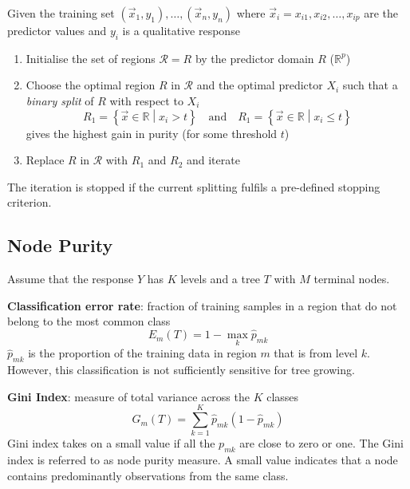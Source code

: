 \documentclass[11pt]{article}
\newcommand*\R{\mathbb{R}}
\begin{document}
\begin{definition}
	Given the training set $(\vec{x}_1,y_1),\dots,(\vec{x}_n,y_n)$ where $\vec{x}_i = x_{i1}, x_{i2}, \dots, x_{ip}$ are the predictor values and $y_i$ is a qualitative response
	\begin{enumerate}
		\item Initialise the set of regions $\mathcal{R} = {R}$ by the predictor domain $R$ ($\R^p$)
		\item Choose the optimal region $R$ in $\mathcal{R}$ and the optimal predictor $X_i$ such that a \emph{binary split} of $R$ with respect to $X_i$
		\begin{equation*}
			R_1 = \left\{ \vec{x} \in \R \middle| x_i > t \right\} \quad\text{and}\quad R_1 = \left\{ \vec{x} \in \R \middle| x_i \leq t \right\}
		\end{equation*}
		gives the highest gain in purity (for some threshold $t$)
		\item Replace $R$ in $\mathcal{R}$ with $R_1$ and $R_2$ and iterate
	\end{enumerate}
	The iteration is stopped if the current splitting fulfils a pre-defined stopping criterion.
\end{definition}

\subsection{Node Purity}
Assume that the response $Y$ has $K$ levels and a tree $T$ with $M$ terminal nodes.

\vspace{1em}
\noindent
\textbf{Classification error rate}: fraction of training samples in a region that do not belong to the most common class
\begin{equation*}
	E_m(T) = 1 - \max_k \hat{p}_{mk}
\end{equation*}
$\hat{p}_{mk}$ is the proportion of the training data in region $m$ that is from level $k$. However, this classification is not sufficiently sensitive for tree growing.

\vspace{1em}
\noindent
\textbf{Gini Index}: measure of total variance across the $K$ classes 
\begin{equation*}
	G_m(T) = \sum_{k=1}^{K} \hat{p}_{mk} (1 - \hat{p}_{mk})
\end{equation*}
Gini index takes on a small value if all the $p_{mk}$ are close to zero or one. The Gini index is referred to as node purity measure. A small value indicates that a node contains predominantly observations from the same class.
\end{document}
